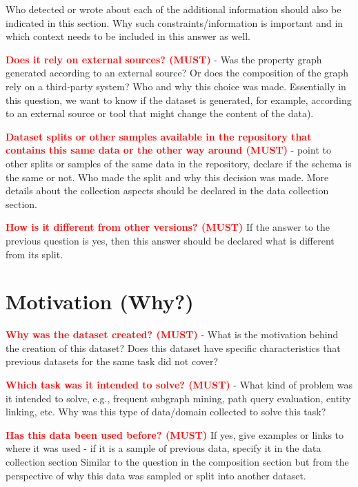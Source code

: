 \documentclass[letterpaper,11pt]{article}
\begin{document}
Who detected or wrote about each of the additional information should also be indicated in this section. Why such constraints/information is important and in which context needs to be included in this answer as well. 

\textbf{\textcolor{red}{Does it rely on external sources? (MUST)}} - Was the property graph generated according to an external source? Or does the composition of the graph rely on a third-party system? Who and why this choice was made.
Essentially in this question, we want to know if the dataset is generated, for example, according to an external source or tool that might change the content of the data).

\textbf{\textcolor{red}{Dataset splits or other samples available in the repository that contains this same data or the other way around (MUST)}} - point to other splits or samples of the same data in the repository, declare if the schema is the same or not. Who made the split and why this decision was made. More details about the collection aspects should be declared in the data collection section. 

\textbf{\textcolor{red}{How is it different from other versions? (MUST)}}
If the answer to the previous question is yes, then this answer should be declared what is different from its split. 

\section{Motivation (Why?)}

\textbf{\textcolor{red}{Why was the dataset created? (MUST)}} - What is the motivation behind the creation of this dataset? Does this dataset have specific characteristics that previous datasets for the same task did not cover? 

\textbf{\textcolor{red}{Which task was it intended to solve? (MUST)}} - What kind of problem was it intended to solve, e.g., frequent subgraph mining, path query evaluation, entity linking, etc. Why was this type of data/domain collected to solve this task?

\textbf{\textcolor{red}{Has this data been used before? (MUST)}} If yes, give examples or links to where it was used - if it is a sample of previous data, specify it in the data collection section
Similar to the question in the composition section but from the perspective of why this data was sampled or split into another dataset. 
\end{document}
